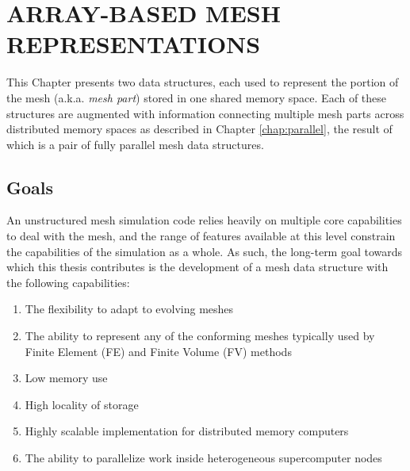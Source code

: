 
\chapter{ARRAY-BASED MESH REPRESENTATIONS}
\label{chap:struct}
\nocite{ibanez2017modifiable}

This Chapter presents two data structures, each used to represent
the portion of the mesh (a.k.a. \emph{mesh part}) stored in one
shared memory space.
Each of these structures are augmented with information connecting multiple
mesh parts across distributed memory spaces as described in
Chapter \ref{chap:parallel}, the result of which is a pair of fully parallel
mesh data structures.

\section{Goals}
\label{sec:struct_goals}

An unstructured mesh simulation code relies heavily on
multiple core capabilities to deal with the mesh,
and the range of features available at this level constrain
the capabilities of the simulation as a whole.
As such, the long-term goal towards which this thesis
contributes is the development of a mesh data structure
with the following capabilities:

\begin{enumerate}
\item The flexibility to adapt to evolving meshes
\item The ability to represent any of the conforming meshes typically
used by Finite Element (FE) and Finite Volume (FV) methods
\item Low memory use
\item High locality of storage
\item Highly scalable implementation for distributed memory computers
\item The ability to parallelize work inside heterogeneous
supercomputer nodes
\end{enumerate}

